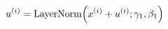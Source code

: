 \documentclass[preview]{standalone}
\begin{document}
\begin{align*}
u^{(i)} = \text{LayerNorm}\Bigl(x^{(i)} + u^{(i)}; \gamma_1, \beta_1\Bigr)
\end{align*}
\end{document}
